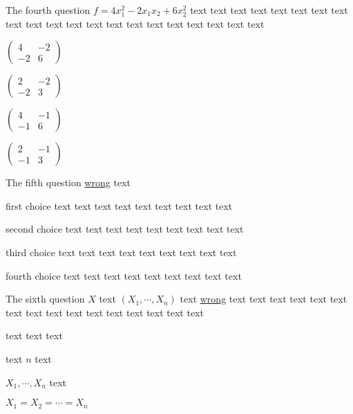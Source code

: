 \documentclass[12pt,math=all]{randexam}
\begin{document}
\bigskip

\begin{question}
The fourth question $f = 4 x_1^2 - 2 x_1 x_2 + 6 x_2^2$ text text text text text text
text text text text text text text text text text text text text text text 
\begin{abcd}
\item $\left(\begin{array}{cc}
  4 & - 2\\
  - 2 & 6
\end{array}\right)$
\item $\left(\begin{array}{cc}
  2 & - 2\\
  - 2 & 3
\end{array}\right)$
\item $\left(\begin{array}{cc}
  4 & - 1\\
  - 1 & 6
\end{array}\right)$
\item $\left(\begin{array}{cc}
  2 & - 1\\
  - 1 & 3
\end{array}\right)$
\end{abcd}
\end{question}

\bigskip

\begin{question}
The fifth question \underline{wrong} text 
\begin{abcd}
\item first choice text text text text text text text text text
\item second choice text text text text text text text text text
\item third choice text text text text text text text text text
\item fourth choice text text text text text text text text text
\end{abcd}
\end{question}

\bigskip

\begin{question}
The sixth question $X$ text $(X_1,\cdots,X_n)$ text \underline{wrong} text text
text text text text text text text text text text text text text text 
\begin{abcd}
\item text text text
\item text $n$ text
\item $X_1, \cdots, X_n$ text
\item $X_1 = X_2 =\cdots = X_n$
\end{abcd}
\end{question}
\end{document}
